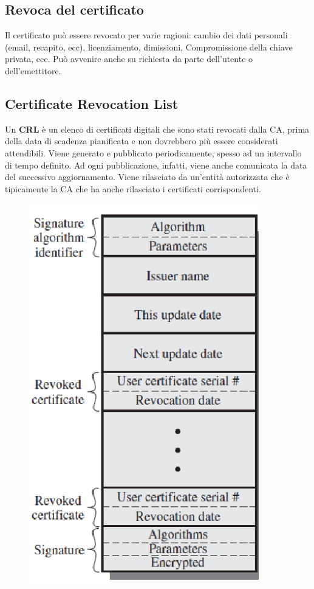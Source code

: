 \subsection{Revoca del certificato}

Il certificato può essere revocato per varie ragioni: cambio dei dati 
personali (email, recapito, ecc),
licenziamento, dimissioni, Compromissione della chiave privata, ecc.
Può avvenire anche su richiesta da parte dell’utente o dell’emettitore.

\subsection{Certificate Revocation List}

Un \textbf{CRL} è un elenco di certificati digitali che sono stati revocati 
dalla CA,
prima della data di scadenza pianificata e non dovrebbero più essere 
considerati attendibili.
Viene generato e pubblicato periodicamente, spesso ad un intervallo di 
tempo definito. Ad ogni
pubblicazione, infatti, viene anche comunicata la data del successivo
aggiornamento.
Viene rilasciato da un'entità autorizzata che è tipicamente la CA 
che ha anche rilasciato i certificati
corrispondenti.

\begin{figure}[H]
    \centering
    \includegraphics[width=10cm, keepaspectratio]{capitoli/crittografia/imgs/CRL.png}
\end{figure}

